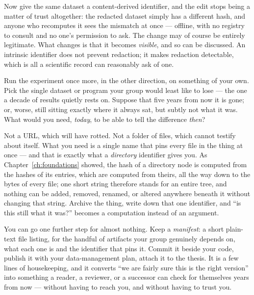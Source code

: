 Now give the same dataset a content-derived identifier, and the edit stops being a matter of trust
altogether: the redacted dataset simply has a different hash, and anyone who recomputes it sees the
mismatch at once --- offline, with no registry to consult and no one's permission to ask. The change
may of course be entirely legitimate. What changes is that it becomes \emph{visible}, and so can be
discussed. An intrinsic identifier does not prevent redaction; it makes redaction detectable, which
is all a scientific record can reasonably ask of one.


Run the experiment once more, in the other direction, on something of your own. Pick the single
dataset or program your group would least like to lose --- the one a decade of results quietly rests
on. Suppose that five years from now it is gone; or, worse, still sitting exactly where it always
sat, but subtly not what it was. What would you need, \emph{today}, to be able to tell the difference
\emph{then}?

Not a URL, which will have rotted. Not a folder of files, which cannot testify about itself. What you
need is a single name that pins every file in the thing at once --- and that is exactly what a
\emph{directory} identifier gives you. As Chapter~\ref{ch:foundations} showed, the hash of a
directory node is computed from the hashes of its entries, which are computed from theirs, all the
way down to the bytes of every file; one short string therefore stands for an entire tree, and
nothing can be added, removed, renamed, or altered anywhere beneath it without changing that string.
Archive the thing, write down that one identifier, and \enquote{is this still what it was?} becomes a
computation instead of an argument.

You can go one further step for almost nothing. Keep a \emph{manifest}: a short plain-text file
listing, for the handful of artifacts your group genuinely depends on, what each one is and the
identifier that pins it. Commit it beside your code, publish it with your data-management plan,
attach it to the thesis. It is a few lines of housekeeping, and it converts \enquote{we are fairly
sure this is the right version} into something a reader, a reviewer, or a successor can check for
themselves years from now --- without having to reach you, and without having to trust you.


